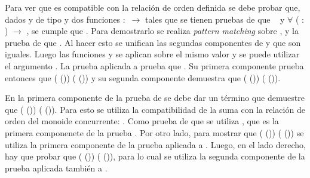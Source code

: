 \begin{AgdaAlign}
Para ver que  es compatible con la relación de orden definida se debe probar que, dados  y   de tipo   y dos funciones  $:$  $\rightarrow$   tales que se tienen pruebas de que \hbox{  } y $\forall$ ( $:$ ) $\rightarrow$   , se cumple que     . Para demostrarlo se realiza \textit{pattern matching} sobre ,  y la prueba de que   . Al hacer esto se unifican las segundas componentes de  y  que son iguales. Luego las funciones  y  se aplican sobre el mismo valor  y se puede utilizar el argumento . La prueba  aplicada a  prueba que   . Su primera componente prueba entonces que ( ()) \AgdaField{$\lesssim$} ( ()) y su segunda componente demuestra que ( ()) \AgdaFunction{$\equiv$} ( ()).


En la primera componente de la prueba de  se debe dar un término que demuestre que  \AgdaField{+} ( ()) \AgdaField{$\lesssim$}  \AgdaField{+} ( ()). Para esto se utiliza la compatibilidad de la suma con la relación de orden del monoide concurrente: . Como prueba de que  \AgdaField{$\lesssim$}  se utiliza , que es la primera componenete de la prueba   . Por otro lado, para mostrar que ( ()) \AgdaField{$\lesssim$} ( ()) se utiliza la primera componente de la prueba  aplicada a . Luego, en el lado derecho, hay que probar que ( ()) \AgdaFunction{$\equiv$} ( ()), para lo cual se utiliza la segunda componente de la prueba  aplicada también a .


\end{AgdaAlign}
